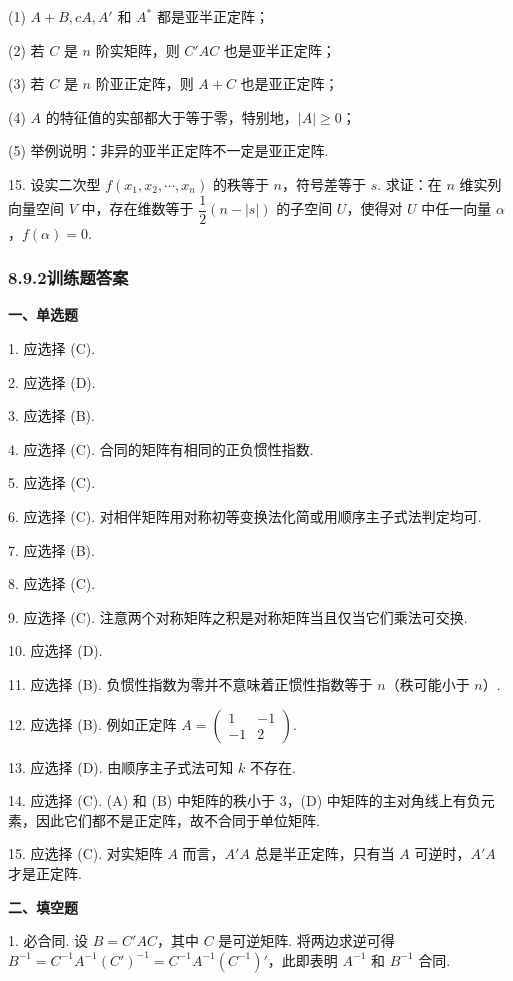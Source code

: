 \documentclass[UTF8,12pt,a4paper,fontset=fandol]{ctexart}
\begin{document}
(1) $A+B,cA,A'$ 和 $A^*$ 都是亚半正定阵；

(2) 若 $C$ 是 $n$ 阶实矩阵，则 $C'AC$ 也是亚半正定阵；

(3) 若 $C$ 是 $n$ 阶亚正定阵，则 $A+C$ 也是亚正定阵；

(4) $A$ 的特征值的实部都大于等于零，特别地，$|A|\ge 0$；

(5) 举例说明：非异的亚半正定阵不一定是亚正定阵.

15. 设实二次型 $f(x_1,x_2,\cdots,x_n)$ 的秩等于 $n$，符号差等于 $s$. 求证：在 $n$ 维实列向量空间 $V$ 中，存在维数等于 $\dfrac12(n-|s|)$ 的子空间 $U$，使得对 $U$ 中任一向量 $\alpha$，$f(\alpha)=0$.

\subsubsection*{8.9.2\quad 训练题答案}

\noindent\textbf{一、单选题}

1. 应选择 (C).

2. 应选择 (D).

3. 应选择 (B).

4. 应选择 (C). 合同的矩阵有相同的正负惯性指数.

5. 应选择 (C).

6. 应选择 (C). 对相伴矩阵用对称初等变换法化简或用顺序主子式法判定均可.

7. 应选择 (B).

8. 应选择 (C).

9. 应选择 (C). 注意两个对称矩阵之积是对称矩阵当且仅当它们乘法可交换.

10. 应选择 (D).

11. 应选择 (B). 负惯性指数为零并不意味着正惯性指数等于 $n$（秩可能小于 $n$）.

12. 应选择 (B). 例如正定阵 $A=\left(\begin{array}{cc}1&-1\\ -1&2\end{array}\right)$.

13. 应选择 (D). 由顺序主子式法可知 $k$ 不存在.

14. 应选择 (C). (A) 和 (B) 中矩阵的秩小于 $3$，(D) 中矩阵的主对角线上有负元素，因此它们都不是正定阵，故不合同于单位矩阵.

15. 应选择 (C). 对实矩阵 $A$ 而言，$A'A$ 总是半正定阵，只有当 $A$ 可逆时，$A'A$ 才是正定阵.

\noindent\textbf{二、填空题}

1. 必合同. 设 $B=C'AC$，其中 $C$ 是可逆矩阵. 将两边求逆可得 $B^{-1}=C^{-1}A^{-1}(C')^{-1}=C^{-1}A^{-1}(C^{-1})'$，此即表明 $A^{-1}$ 和 $B^{-1}$ 合同.
\end{document}
